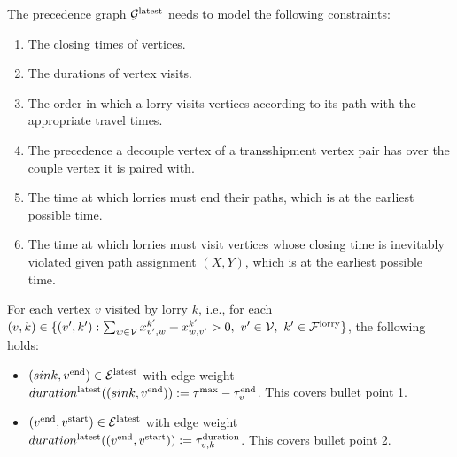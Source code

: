 





The precedence graph
$\mathcal G^{\rm latest} $
needs to model the following constraints:
\begin{enumerate}
  \item \label{latest:closing} The closing times of vertices.
  \item The durations of vertex visits.
  \item The order in which a lorry visits vertices according to its path with the appropriate travel times.
  \item The precedence a decouple vertex of a transshipment vertex pair has over the couple vertex it is paired with.
  \item The time at which lorries must end their paths, which is at the earliest possible time.
  \item The time at which lorries must visit vertices whose closing time is inevitably violated given path assignment $(X,Y) $, which is at the earliest possible time.
\end{enumerate}

%


For each vertex $v$ visited by lorry $k$, i.e., for each
 $(v,k) \in  \{ (v',k') :
\sum_{w \in \mathcal V} x^{k'}_{v',w} + x^{k'}_{w,v'} > 0,
\ v' \in \mathcal V,
\ k' \in \mathcal F^{\rm lorry} \}$,
the following holds:
\begin{itemize}
  \item
  $( sink,v^{\rm end})  \in \mathcal E^{\rm latest} $
  with edge weight
    $duration^{\rm latest}((sink,v^{\rm end})) := \tau^{\rm max} - \tau^{\rm end}_v $.
    This covers bullet point 1.
  \item
  $(v^{\rm end},v^{\rm start}) \in \mathcal E^{\rm latest}$
  with edge weight
  $duration^{\rm latest}((v^{\rm end},v^{\rm start})) := \tau^{\rm duration}_{v,k}$.
  This covers bullet point 2.
\end{itemize}



